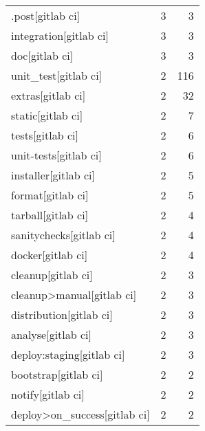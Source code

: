 \begin{tabular}{lrr}
.post[gitlab ci]                           &                   3 &             3 \\
integration[gitlab ci]                     &                   3 &             3 \\
doc[gitlab ci]                             &                   3 &             3 \\
unit\_test[gitlab ci]                       &                   2 &           116 \\
extras[gitlab ci]                          &                   2 &            32 \\
static[gitlab ci]                          &                   2 &             7 \\
tests[gitlab ci]                           &                   2 &             6 \\
unit-tests[gitlab ci]                      &                   2 &             6 \\
installer[gitlab ci]                       &                   2 &             5 \\
format[gitlab ci]                          &                   2 &             5 \\
tarball[gitlab ci]                         &                   2 &             4 \\
sanitychecks[gitlab ci]                    &                   2 &             4 \\
docker[gitlab ci]                          &                   2 &             4 \\
cleanup[gitlab ci]                         &                   2 &             3 \\
cleanup>manual[gitlab ci]                  &                   2 &             3 \\
distribution[gitlab ci]                    &                   2 &             3 \\
analyse[gitlab ci]                         &                   2 &             3 \\
deploy:staging[gitlab ci]                  &                   2 &             3 \\
bootstrap[gitlab ci]                       &                   2 &             2 \\
notify[gitlab ci]                          &                   2 &             2 \\
deploy>on\_success[gitlab ci]               &                   2 &             2 \\

\end{tabular}
